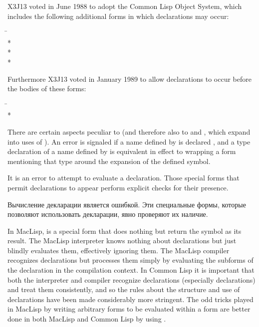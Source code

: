 \begin{defspec}
\begin{new}
X3J13 voted in June 1988
to adopt the Common Lisp Object System,
which includes the following additional forms in which declarations
may occur:
\begin{lisp}
\hskip 12pc\=\kill
{}\> \\*
\> \\*
\> \\*
\end{lisp}
Furthermore X3J13 voted in January 1989
to allow declarations to
occur before the bodies of these forms:
\begin{lisp}
\hskip 12pc\=\kill
{}\> \\*
\end{lisp}
There are certain aspects peculiar to 
(and therefore also to  and ,
which expand into uses of ).
An error is signaled if a name defined by 
is declared , and a type declaration of a name
defined by  is equivalent in effect
to wrapping a  form mentioning that type around
the expansion of the defined symbol.
\end{new}

It is an error to attempt to evaluate a declaration.
Those special forms that permit declarations to appear
perform explicit checks for their presence.

Вычисление декларации является ошибкой. Эти специальные формы, которые позволяют
использовать декларации, явно проверяют их наличие.

\beforenoterule
\begin{incompatibility}
In MacLisp,  is a special form
that does nothing but return the symbol  as its
result.  The MacLisp interpreter knows nothing about declarations
but just blindly evaluates them, effectively ignoring them.
The MacLisp compiler recognizes declarations but processes
them simply by evaluating the subforms of the declaration in
the compilation context.  In Common Lisp it is
important that both the interpreter and compiler recognize
declarations (especially  declarations) and treat them
consistently,
and so the rules about the structure and use of declarations
have been made considerably more stringent.
The odd tricks played in MacLisp by writing arbitrary forms
to be evaluated within a  form
are better done in both MacLisp and Common Lisp by using .
\end{incompatibility}
\afternoterule


\end{defspec}
